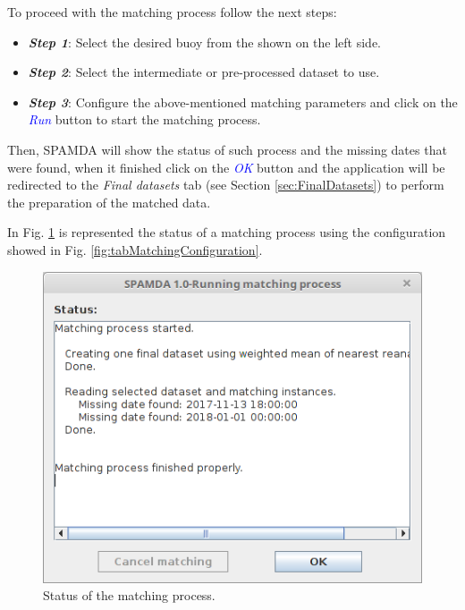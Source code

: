 \begin{onehalfspace}
\begin{itemize}
\begin{itemize}
						\end{itemize}
						
				\end{itemize}
				
				To proceed with the matching process follow the next steps:
				
					\begin{itemize}
						\item \textit{\textbf{Step 1}}: Select the desired buoy from the shown on the left side.
						\item \textit{\textbf{Step 2}}: Select the intermediate or pre-processed dataset to use.
						\item \textit{\textbf{Step 3}}: Configure the above-mentioned matching parameters and click on the \textcolor{blue}{\textit{Run}} button to start the matching process.
					\end{itemize}
					
				Then, SPAMDA will show the status of such process and the missing dates that were found, when it finished click on the \textcolor{blue}{\textit{OK}} button and the application will be redirected to the \textit{Final datasets} tab (see Section \ref{sec:FinalDatasets}) to perform the preparation of the matched data.
				
				In Fig. \ref{fig:statusMatchingProcess} is represented the status of a matching process using the configuration showed in Fig. \ref{fig:tabMatchingConfiguration}.
				
					\begin{figure}[ht!]
						\centering
						\includegraphics[scale=0.40]{figures/statusMatchingProcess.png}
						\caption{Status of the matching process.}
						\label{fig:statusMatchingProcess}
					\end{figure}
				

\end{onehalfspace}
